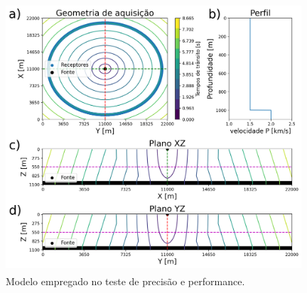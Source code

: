 \begin{figure}[H]
	\centering
	\includegraphics[width = 11cm, height = 10cm]{Imgs/RevisaoBibliografica/modelGeometry.png}
	\caption{Modelo empregado no teste de precisão e performance.}
	\label{fig:configurationNumericalComparison}
\end{figure}


